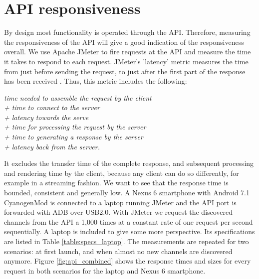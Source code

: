 \section{API responsiveness}\label{sec:api_responsiveness}
By design most functionality is operated through the API.
Therefore, measuring the responsiveness of the API will give a good indication of the responsiveness overall.
We use Apache JMeter to fire requests at the API and measure the time it takes to respond to each request.
JMeter's 'latency' metric measures the time from just before sending the request, to just after the first part of the response has been received \cite{jmeter_glossary}.
Thus, this metric includes the following:\\
\begin{minipage}{\textwidth}
\hspace{13em}
\begin{minipage}{.5\textwidth}
\emph{
	time needed to assemble the request by the client\\
	+ time to connect to the server\\
	+ latency towards the serve\\
	+ time for processing the request by the server\\
	+ time to generating a response by the server\\
	+ latency back from the server.\\
}
\end{minipage}
\end{minipage}
It excludes the transfer time of the complete response, and subsequent processing and rendering time by the client, because any client can do so differently, for example in a streaming fashion.
We want to see that the response time is bounded, consistent and generally low.
A Nexus 6 smartphone with Android 7.1 CyanogenMod is connected to a laptop running JMeter and the API port is forwarded with ADB over USB2.0.
With JMeter we request the discovered channels from the API a 1,000 times at a constant rate of one request per second sequentially.
A laptop is included to give some more perspective.
Its specifications are listed in Table \ref{table:specs_laptop}.
The measurements are repeated for two scenarios: at first launch, and when almost no new channels are discovered anymore.
Figure \ref{fig:api_combined} shows the response times and sizes for every request in both scenarios for the laptop and Nexus 6 smartphone.
